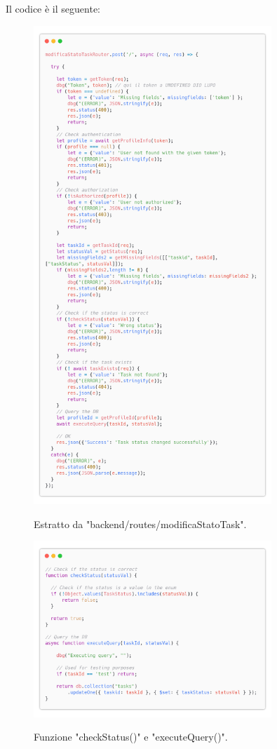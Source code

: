 \documentclass{report}
\begin{document}
Il codice è il seguente:
\begin{figure}[H]
	\centering\includegraphics[width=0.8\textwidth]{images/code_modifica_stato.png}
	
	Estratto da "backend/routes/modificaStatoTask".
\end{figure}
\begin{figure}[H]
	\centering\includegraphics[width=0.8\textwidth]{images/code_modifica_stato_query.png}
	
	Funzione "checkStatus()" e "executeQuery()".
\end{figure}
\end{document}
